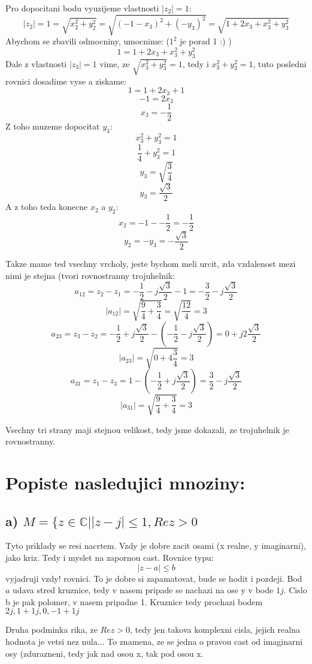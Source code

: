 Pro dopocitani bodu vyuzijeme vlastnosti $|z_2| = 1$:
$$|z_2| = 1 = \sqrt{x_2^2+y_2^2} = \sqrt{(-1-x_3)^2 + (-y_3)^2} = \sqrt{1+2x_3 + x_3^2 + y_3^2}$$
Abychom se zbavili odmocniny, umocnime: ($1^2$ je porad 1 :) )
$$1 = 1+2x_3 + x_3^2 + y_3^2$$
Dale z vlastnosti $|z_3| = 1$ vime, ze $\sqrt{x_3^2 + y_3^2}=1$, tedy i $x_3^2 + y_3^2 = 1$, tuto posledni rovnici dosadime vyse a ziskame:
$$1 = 1+2x_3 + 1$$
$$-1 = 2x_3$$
$$x_3 = -\frac{1}{2}$$
Z toho muzeme dopocitat $y_3$:
$$x_3^2 + y_3^2 = 1$$
$$\frac{1}{4} + y_3^2 = 1$$
$$y_3 = \sqrt{\frac{3}{4}}$$
$$y_3 = \frac{\sqrt{3}}{2}$$
A z toho teda konecne $x_2$ a $y_2$:
$$x_2 = -1 - -\frac{1}{2} = -\frac{1}{2}$$
$$y_2 = -y_3 = -\frac{\sqrt{3}}{2}$$

Takze mame ted vsechny vrcholy, jeste bychom meli urcit, zda vzdalenost mezi nimi je stejna (tvori rovnostranny trojuhelnik:
$$a_{12} = z_2 - z_1 = -\frac{1}{2}-j\frac{\sqrt{3}}{2} - 1 = -\frac{3}{2}-j\frac{\sqrt{3}}{2}$$
$$|a_{12}| = \sqrt{\frac{9}{4}+\frac{3}{4}} = \sqrt{\frac{12}{4}} = 3$$
$$a_{23} = z_3 - z_2 = -\frac{1}{2} + j\frac{\sqrt{3}}{2} - \left( -\frac{1}{2} -j\frac{\sqrt{3}}{2}  \right) = 0+j2\frac{\sqrt{3}}{2}$$
$$|a_{23}| = \sqrt{0+4\frac{3}{4}} = 3$$
$$a_{31} = z_1 - z_3 = 1 - \left( -\frac{1}{2}+j\frac{\sqrt{3}}{2} \right) = \frac{3}{2} - j\frac{\sqrt{3}}{2}$$
$$|a_{31}| = \sqrt{\frac{9}{4}+\frac{3}{4}} = 3$$

Vsechny tri strany maji stejnou velikost, tedy jsme dokazali, ze trojuhelnik je rovnostranny.

\section{Popiste nasledujici mnoziny:}
\subsection*{a) $M = \{ z \in \mathbb{C} \vert |z-j| \leq 1, Re z > 0$}
Tyto priklady se resi nacrtem. Vzdy je dobre zacit osami (x realne, y imaginarni), jako kriz. Tedy i myslet na zapornou cast. Rovnice typu:
$$|z-a|\leq b$$
vyjadruji vzdy! rovnici. To je dobre si zapamatovat, bude se hodit i pozdeji. Bod $a$ udava stred kruznice, tedy v nasem pripade se nachazi na ose y v bode $1j$. Cislo b je pak polomer, v nasem pripadne 1. Kruznice tedy prochazi bodem $2j, 1+1j, 0, -1+1j$

Druha podminka rika, ze $Re z > 0$, tedy jen takova komplexni cisla, jejich realna hodnota je vetsi nez nula... To znamena, ze se jedna o pravou cast od imaginarni osy (zdurazneni, tedy jak nad osou x, tak pod osou x.

